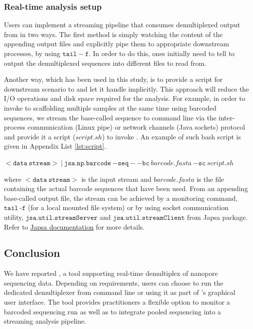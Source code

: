 \subsubsection{Real-time analysis setup}
Users can implement a streaming pipeline that consumes demultiplexed output from \npbarcode{} in two ways. 
The first method is simply watching the content of the appending output files and explicitly pipe them to appropriate downstream processes, \EG{} by using $\mathtt{tail -f}$.
In order to do this, ones initially need to tell \npbarcode{} to output the demultiplexed sequences into different files to read from.

Another way, which has been used in this study, is to provide a script for downstream scenario to \npbarcode{} and let it handle implicitly. This approach will reduce the I/O operations and disk space required for the analysis. For example, in order to invoke \npscarf{} to scaffolding multiple samples at the same time using barcoded sequences, we stream the base-called sequence to \npbarcode{} command line via the inter-process communication (Linux pipe) or network channels (Java sockets) protocol \cite{CaoGE2015} and provide it a script ($\mathit{script.sh}$) to invoke \npscarf{}. An example of such bash script is given in Appendix List \ref{lst:script}.

$\mathtt{<data \: stream>}~|~\mathtt{jsa.np.barcode} \ \mathtt{-seq} \ \mathit{-} \ \mathtt{-bc} \ \mathit{barcode.fasta} \ \mathtt{-sc} \ \mathit{script.sh}$

where $\mathtt{<data \: stream>}$ is the input stream and $\mathit{barcode.fasta}$ is the file containing the actual barcode sequences that have been used.
From an appending base-called output file, the stream can be achieved by a monitoring command, \EG{} $\mathtt{tail}\ \text{-}\mathtt{f}$ (for a local mounted file system) or by using socket communication utility, \EG{} $\mathtt{jsa.util.streamServer}$ and $\mathtt{jsa.util.streamClient}$ from Japsa package.
Refer to \href{http://japsa.readthedocs.org/en/latest/index.html}{Japsa documentation} for more details.

\subsection{Conclusion}

We have reported \npbarcode{}, a tool supporting real-time demultiplex of nanopore sequencing data. 
Depending on requirements, users can choose to run the dedicated demultiplexer from command line or using it as part of \npreader's graphical user interface. 
The tool provides practitioners a flexible option to monitor a barcoded sequencing run as well as to integrate pooled sequencing into a streaming analysis pipeline.

